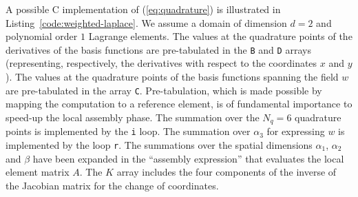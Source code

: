 A possible C implementation of (\ref{eq:quadrature}) is illustrated in Listing~\ref{code:weighted-laplace}. We assume a domain of dimension $d=2$ and polynomial order $1$ Lagrange elements. The values at the quadrature points of the derivatives of the basis functions are pre-tabulated in the \texttt{B} and \texttt{D} arrays (representing, respectively, the derivatives with respect to the coordinates $x$ and $y$). The values at the quadrature points of the basis functions spanning the field $w$ are pre-tabulated in the array \texttt{C}. Pre-tabulation, which is made possible by mapping the computation to a reference element, is of fundamental importance to speed-up the local assembly phase. The summation over the $N_q = 6$ quadrature points is implemented by the \texttt{i} loop. The summation over $\alpha_3$ for expressing $w$ is implemented by the loop \texttt{r}. The summations over the spatial dimensions $\alpha_1$, $\alpha_2$ and $\beta$ have been expanded in the ``assembly expression'' that evaluates the local element matrix $A$. The $K$ array includes the four components of the inverse of the Jacobian matrix for the change of coordinates. 

